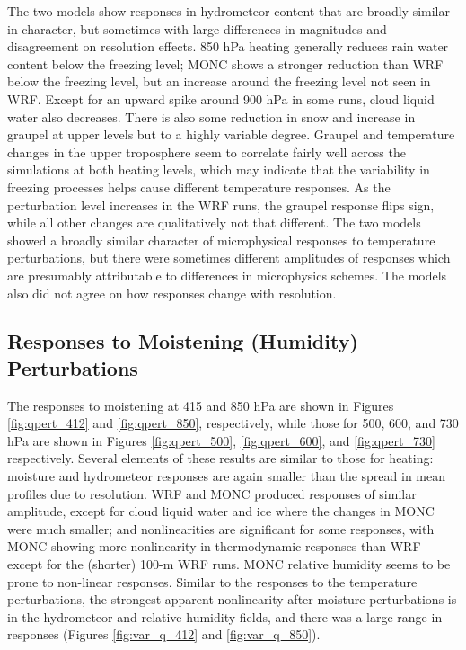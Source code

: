 \documentclass[draft]{agujournal2019}
\begin{document}
The two models show responses in hydrometeor content that are broadly similar in
character, but sometimes with large differences in magnitudes and disagreement
on resolution effects. 850 hPa heating generally reduces rain water content
below the freezing level; MONC shows a stronger reduction than WRF below the
freezing level, but an increase around the freezing level not seen in WRF.
Except for an upward spike around 900 hPa in some runs, cloud liquid water also
decreases. There is also some reduction in snow and increase in graupel at upper
levels but to a highly variable degree. Graupel and temperature changes in the
upper troposphere seem to correlate fairly well across the simulations at both
heating levels, which may indicate that the variability in freezing processes
helps cause different temperature responses. As the perturbation level increases
in the WRF runs, the graupel response flips sign, while all other changes are
qualitatively not that different. The two models showed a broadly similar
character of microphysical responses to temperature perturbations, but there
were sometimes different amplitudes of responses which are presumably
attributable to differences in microphysics schemes. The models also did not
agree on how responses change with resolution.

\subsection{Responses to Moistening (Humidity) Perturbations}

The responses to moistening at 415 and 850 hPa are shown in Figures
\ref{fig:qpert_412} and \ref{fig:qpert_850}, respectively, while those for 500,
600, and 730 hPa are shown in Figures \ref{fig:qpert_500}, \ref{fig:qpert_600},
and \ref{fig:qpert_730} respectively. Several elements of these results are
similar to those for heating: moisture and hydrometeor responses are again
smaller than the spread in mean profiles due to resolution. WRF and MONC
produced responses of similar amplitude, except for cloud liquid water and ice
where the changes in MONC were much smaller; and nonlinearities are significant
for some responses, with MONC showing more nonlinearity in thermodynamic
responses than WRF except for the (shorter) 100-m WRF runs. MONC relative
humidity seems to be prone to non-linear responses. Similar to the responses to
the temperature perturbations, the strongest apparent nonlinearity after
moisture perturbations is in the hydrometeor and relative humidity fields, and
there was a large range in responses (Figures \ref{fig:var_q_412} and
\ref{fig:var_q_850}).
\end{document}
